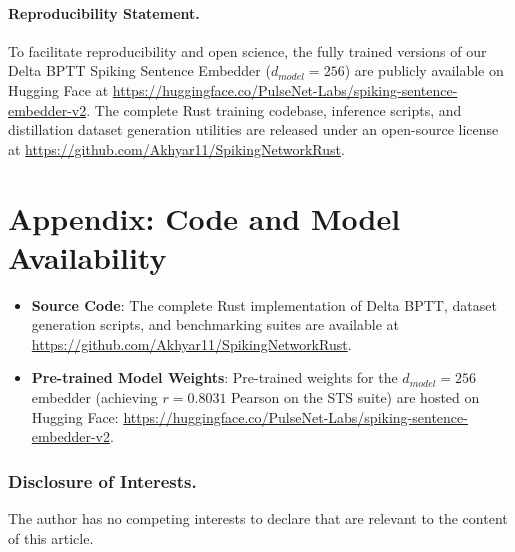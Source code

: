 \documentclass[runningheads]{llncs}
\begin{document}
\paragraph{Reproducibility Statement.} To facilitate reproducibility and open science, the fully trained versions of our Delta BPTT Spiking Sentence Embedder ($d_{model} = 256$) are publicly available on Hugging Face at \url{https://huggingface.co/PulseNet-Labs/spiking-sentence-embedder-v2}. The complete Rust training codebase, inference scripts, and distillation dataset generation utilities are released under an open-source license at \url{https://github.com/Akhyar11/SpikingNetworkRust}.

\section*{Appendix: Code and Model Availability}
\begin{itemize}
    \item \textbf{Source Code}: The complete Rust implementation of Delta BPTT, dataset generation scripts, and benchmarking suites are available at \url{https://github.com/Akhyar11/SpikingNetworkRust}.
    \item \textbf{Pre-trained Model Weights}: Pre-trained weights for the $d_{model} = 256$ embedder (achieving $r = 0.8031$ Pearson on the STS suite) are hosted on Hugging Face: \url{https://huggingface.co/PulseNet-Labs/spiking-sentence-embedder-v2}.
\end{itemize}

\subsubsection*{Disclosure of Interests.}
{\small The author has no competing interests to declare that are relevant to the content of this article.}
\end{document}
